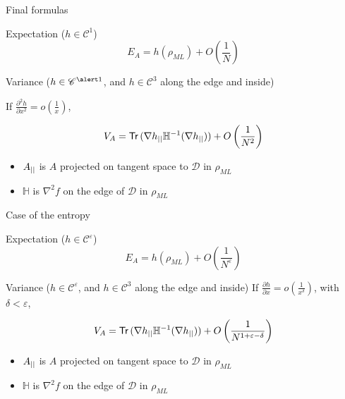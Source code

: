 \documentclass{beamer}
\newcommand{\dpar}[2]{\frac{\partial{#1}}{\partial{#2}}}
\newcommand{\dparn}[3]{\frac{\partial^{#3} {#1}}{\partial{#2}^{#3}}}
\newcommand{\Tr}{\mathsf{Tr}\,}
\newcommand{\class}[1]{{\mathscr{C}^{#1}}}
\newcommand{\ml}{_{M\!L}}
\begin{document}
\begin{frame}{Final formulas}

  \begin{block}{Expectation ($h \in \class 1$)}
    \[E_A = h(\rho\ml) + O \left(\frac 1N\right)\]
  \end{block}

  \begin{block}{Variance ($h \in \class {\alert 1}$, and $h \in \class 3$ along
      the edge and inside)}

    If $\dparn h x 2 = o\left(\frac1x\right)$,

\vspace{-4mm}
    \[V_A = \Tr(\nabla h\pr \mathbb H\inv(\nabla h\pr)) + O \left(\frac 1{N^2}\right)\]

\vspace{-3mm}

    \begin{itemize}
    \item $A_{||}$ is $A$ projected on tangent space to $\mathcal{D}$ in $\rho\ml$
    \item $\mathbb H$ is $\nabla^2f$ on the edge of $\mathcal{D}$ in
      $\rho\ml$
    \end{itemize}
  \end{block}
\end{frame}

\begin{frame}{Case of the entropy}


  \begin{block}{Expectation ($h \in \class \varepsilon$)}
    \[E_A = h(\rho\ml) + O \left(\frac 1{N^{\varepsilon}}\right)\]
  \end{block}

  \begin{block}{Variance ($h \in \class{\varepsilon}$, and $h \in \class 3$
      along the edge and inside)}
    If $\dpar h x = o\left(\frac 1 {x^\delta}\right)$, with $\delta < \varepsilon$,

\vspace{-4mm}

    \[V_A = \Tr(\nabla h\pr \mathbb H\inv(\nabla h\pr)) + O \left(\frac
        1{N^{1+\varepsilon - \delta}}\right)\]

\vspace{-3mm}

    \begin{itemize}
    \item $A_{||}$ is $A$ projected on tangent space to $\mathcal{D}$ in $\rho\ml$
    \item $\mathbb H$ is $\nabla^2f$ on the edge of $\mathcal{D}$ in
      $\rho\ml$
    \end{itemize}
  \end{block}
\end{frame}
\end{document}
